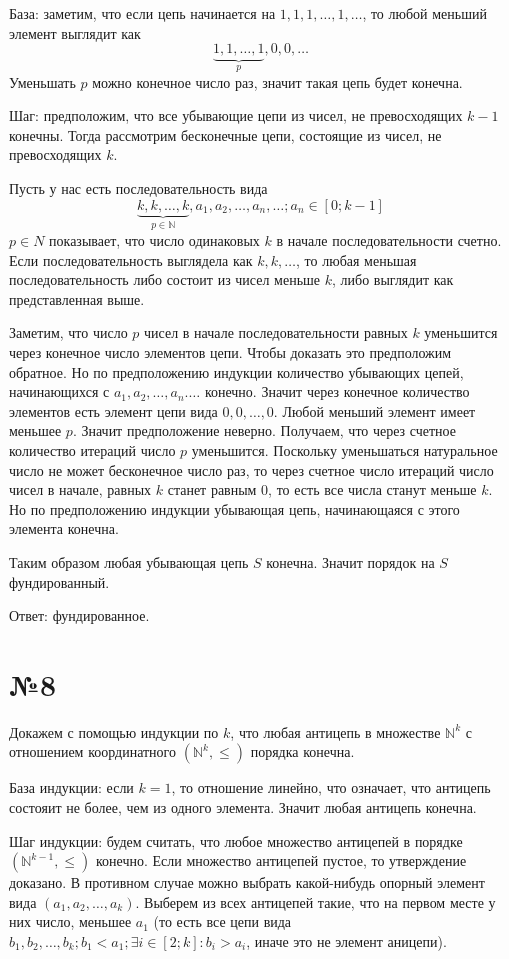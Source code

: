 \documentclass[12pt]{article}
\begin{document}
	База: заметим, что если цепь начинается на $1, 1, 1, \dots, 1, \dots$, то любой меньший элемент выглядит как
	$$ \underbrace{1, 1, \dots, 1}_{p}, 0, 0, \dots$$ Уменьшать $p$ можно конечное число раз, значит такая цепь будет конечна.
	
	Шаг: предположим, что все убывающие цепи из чисел, не превосходящих $k - 1$ конечны. Тогда рассмотрим бесконечные цепи, состоящие из чисел, не превосходящих $k$.
	
	Пусть у нас есть последовательность вида 
	$$ \underbrace{k, k, \dots, k}_{p \in \mathbb{N}}, a_1, a_2, \dots, a_n, \dots; a_n \in [0; k - 1]$$
	$p \in N$ показывает, что число одинаковых $k$ в начале последовательности счетно. Если последовательность выглядела как $k, k, \dots$, то любая меньшая последовательность либо состоит из чисел меньше $k$, либо выглядит как представленная выше.
	
	Заметим, что число $p$ чисел в начале последовательности равных $k$ уменьшится через конечное число элементов цепи. Чтобы доказать это предположим обратное. Но по предположению индукции количество убывающих цепей, начинающихся с $a_1, a_2, \dots, a_n. \dots$ конечно. Значит через конечное количество элементов есть элемент цепи вида $0, 0, \dots, 0$. Любой меньший элемент имеет меньшее $p$. Значит предположение неверно. Получаем, что через счетное количество итераций число $p$ уменьшится. Поскольку уменьшаться натуральное число не может бесконечное число раз, то через счетное число итераций число чисел в начале, равных $k$ станет равным 0, то есть все числа станут меньше $k$. Но по предположению индукции убывающая цепь, начинающаяся с этого элемента конечна.
	
	Таким образом любая убывающая цепь $S$ конечна. Значит порядок на $S$ фундированный.
	
	Ответ: фундированное.
	
	\section*{№8}
	
	Докажем с помощью индукции по $k$, что любая антицепь в множестве $\mathbb{N}^k$  с отношением координатного $(\mathbb{N}^k, \leqslant)$ порядка конечна.
	
	База индукции: если $k = 1$, то отношение линейно, что означает, что антицепь состояит не более, чем из одного элемента. Значит любая антицепь конечна.
	
	Шаг индукции: будем считать, что любое множество антицепей в порядке $(\mathbb{N}^{k - 1}, \leqslant)$ конечно.
	Если множество антицепей пустое, то утверждение доказано.
	В противном случае можно выбрать какой-нибудь опорный элемент вида $(a_1, a_2, \dots, a_k)$.
	Выберем из всех антицепей такие, что на первом месте у них число, меньшее $a_1$ 
	(то есть все цепи вида $b_1, b_2, \dots, b_k; b_1 < a_1; \exists i \in [2; k]: b_i > a_i$, иначе это не элемент аницепи).
	
\end{document}
